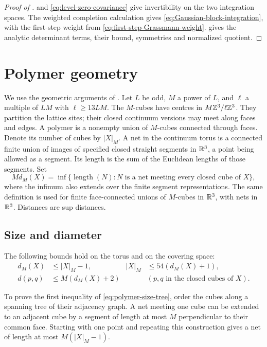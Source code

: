 \begin{proof}[Proof of ]
 and
\eqref{eq:level-zero-covariance} give invertibility on the two
integration spaces. The weighted completion calculation gives
\eqref{eq:Gaussian-block-integration}, with the first-step weight from
\eqref{eq:first-step-Grassmann-weight}.
 gives the analytic determinant
terms, their bound, symmetries and normalized quotient.
\end{proof}


\appendix
\section{Polymer geometry}\label{app:polymer-geometry}

We use the geometric arguments of \cite[Appendix~A]{QED3Manuscript}.
Let $L$ be odd, $M$ a power of $L$, and $\ell$ a multiple of $LM$
with $\ell\ge13LM$. The $M$-cubes have centres in
$M\mathbb Z^3/\ell\mathbb Z^3$. They partition the lattice sites; their closed
continuum versions may meet along faces and edges. A polymer is a
nonempty union of $M$-cubes connected through faces. Denote its number
of cubes by $|X|_M$. A net in the continuum torus is a connected
finite union of images of specified closed straight segments
in $\mathbb R^3$, a point being allowed as a segment.
Its length is the sum of the Euclidean lengths of those segments.
Set
\[
 Md_M(X)=\inf\{\operatorname{length}(N):N
             \text{ is a net meeting every closed cube of }X\},
\]
where the infimum also extends over the finite segment representations.
The same definition is used for finite face-connected unions of
$M$-cubes in $\mathbb R^3$, with nets in $\mathbb R^3$. Distances are sup distances.


\subsection{Size and diameter}
The following bounds hold on the torus and on the covering space:
\begin{align}
 d_M(X)&\le |X|_M-1,&
 |X|_M&\le54(d_M(X)+1),\label{eq:polymer-size-tree}\\
 d(p,q)&\le M(d_M(X)+2)
       &&(p,q\text{ in the closed cubes of }X).
                                  \label{eq:polymer-diameter}
\end{align}

To prove the first inequality of \eqref{eq:polymer-size-tree}, order
the cubes along a spanning tree of their adjacency graph. A net
meeting one cube can be extended to an adjacent cube by a segment of
length at most $M$ perpendicular to their common face. Starting with
one point and repeating this construction gives a net of length at
most $M(|X|_M-1)$.

